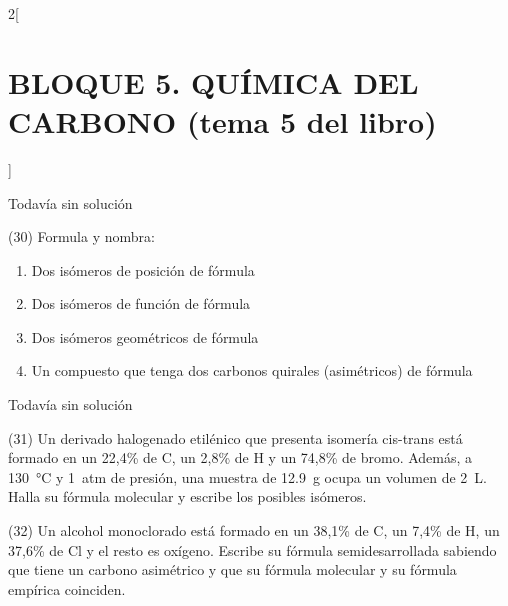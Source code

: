 \documentclass[10pt]{article}
\begin{document}
\begin{multicols}{2}[
  \section{BLOQUE 5. QUÍMICA DEL CARBONO (tema 5 del libro)}
  ]
\begin{solution}[print=false]
  Todavía sin solución
\end{solution}




\begin{exercise}[
    tags    = {},
    topics  = {química, química orgánica, orgánica},
    source  = {FQ 1B MGH 2016, p152, e30},
  ]
  (30) Formula y nombra:
  \begin{enumerate}
    \item Dos isómeros de posición de fórmula 
    \item Dos isómeros de función de fórmula 
    \item Dos isómeros geométricos de fórmula 
    \item Un compuesto que tenga dos carbonos quirales (asimétricos) de fórmula 
  \end{enumerate}
\end{exercise}

\begin{solution}[print=false]
  Todavía sin solución
\end{solution}




\begin{exercise}[
    tags    = {},
    topics  = {química, química orgánica, orgánica},
    source  = {FQ 1B MGH 2016, p152, e31},
  ]
  (31) Un derivado halogenado etilénico que presenta isomería cis-trans está formado en un 22,4\% de C, un 2,8\% de H y un 74,8\% de bromo. Además, a \SI{130}{\celsius} y \SI{1}{atm} de presión, una muestra de \SI{12,9}{\gram} ocupa un volumen de \SI{2}{\liter}. Halla su fórmula molecular y escribe los posibles isómeros.
\end{exercise}

\begin{solution}
\end{solution}




\begin{exercise}[
    tags    = {},
    topics  = {química, química orgánica, orgánica},
    source  = {FQ 1B MGH 2016, p152, e32},
  ]
  (32) Un alcohol monoclorado está formado en un 38,1\% de C,
  un 7,4\% de H, un 37,6\% de Cl y el resto es oxígeno. Escribe
  su fórmula semidesarrollada sabiendo que tiene un carbono
  asimétrico y que su fórmula molecular y su fórmula empírica
  coinciden.
\end{exercise}


\end{multicols}
\end{document}
